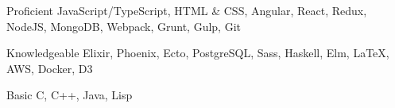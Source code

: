 

\begin{cvskills}

  \cvskill
    {Proficient} %
    {JavaScript/TypeScript, HTML \& CSS, Angular, React, Redux, NodeJS, MongoDB, Webpack, Grunt, Gulp, Git} %

  \cvskill
    {Knowledgeable} %
    {Elixir, Phoenix, Ecto, PostgreSQL, Sass, Haskell, Elm, \LaTeX, AWS, Docker, D3} %

  \cvskill
    {Basic} %
    {C, C++, Java, Lisp} %

\end{cvskills}
